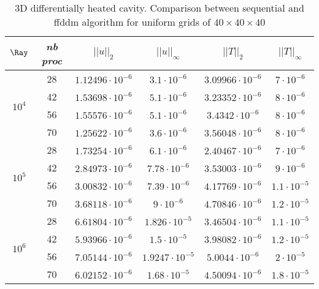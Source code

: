 \begin{table}[!ht]
	\begin{center}
		\begin{tabular}{|*{6}{c|}}
			\hline
			 $\Ray$ & \em{nb proc }                  & $||u||_{2}$                        & $||u||_{\infty}$                & $||T||_{2}$              & $||T||_{\infty}$\\ \hline \hline
			\multirow{4}{*}{$10^4$} & 28 & $1.12496 \cdot 10^{-6}$ & $3.1 \cdot 10^{-6}$ & $ 3.09966 \cdot 10^{-6} $ & $7 \cdot 10^{-6}$ \\%
			\cline{2-6}
			& 42 & $1.53698 \cdot 10^{-6}$ & $5.1 \cdot 10^{-6}$ & $ 3.23352 \cdot 10^{-6} $ & $8 \cdot 10^{-6}$ \\ \cline{2-6} %
			& 56 & $1.55576 \cdot 10^{-6}$ & $5.1 \cdot 10^{-6}$ & $ 3.4342 \cdot 10^{-6} $ & $8 \cdot 10^{-6}$  \\ \cline{2-6} %
			& 70 & $1.25622 \cdot 10^{-6}$ & $3.6 \cdot 10^{-6}$ & $ 3.56048 \cdot 10^{-6} $ & $8 \cdot 10^{-6}$ \\ \hline \hline
			\multirow{4}{*}{$10^5$} & 28 & $1.73254 \cdot 10^{-6}$ & $6.1 \cdot 10^{-6}$ & $ 2.40467 \cdot 10^{-6} $ & $7 \cdot 10^{-6}$ \\%
			\cline{2-6}
			& 42 & $2.84973 \cdot 10^{-6}$ & $7.78 \cdot 10^{-6}$ & $ 3.53003 \cdot 10^{-6} $ & $9 \cdot 10^{-6}$ \\ \cline{2-6} %
			& 56 & $3.00832 \cdot 10^{-6}$ & $7.39 \cdot 10^{-6}$ & $ 4.17769 \cdot 10^{-6} $ & $1.1 \cdot 10^{-5}$  \\ \cline{2-6} %
			& 70 & $3.68118 \cdot 10^{-6}$ & $9 \cdot 10^{-6}$ & $ 4.70846 \cdot 10^{-6} $ & $1.2 \cdot 10^{-5}$ \\ \hline \hline
			\multirow{4}{*}{$10^6$} & 28 & $6.61804 \cdot 10^{-6}$ & $1.826 \cdot 10^{-5}$ & $ 3.46504\cdot 10^{-6} $ & $1.1 \cdot 10^{-5}$ \\%
			\cline{2-6}
			& 42 & $5.93966 \cdot 10^{-6}$ & $1.5 \cdot 10^{-5}$ & $ 3.98082 \cdot 10^{-6} $ & $1.2 \cdot 10^{-5}$ \\ \cline{2-6} %
			& 56 & $7.05144 \cdot 10^{-6}$ & $1.9247 \cdot 10^{-5}$ & $ 5.0044 \cdot 10^{-6} $ & $2 \cdot 10^{-5}$  \\ \cline{2-6} %
			& 70 & $6.02152 \cdot 10^{-6}$ & $1.68 \cdot 10^{-5}$ & $ 4.50094 \cdot 10^{-6} $ & $1.8 \cdot 10^{-5}$ \\ \hline
		\end{tabular}
	\end{center}
	\caption {3D differentially heated cavity. Comparison between sequential and ffddm algorithm for uniform grids of $40 \times 40 \times 40$ }
	\label{tab-T1}
\end{table}


